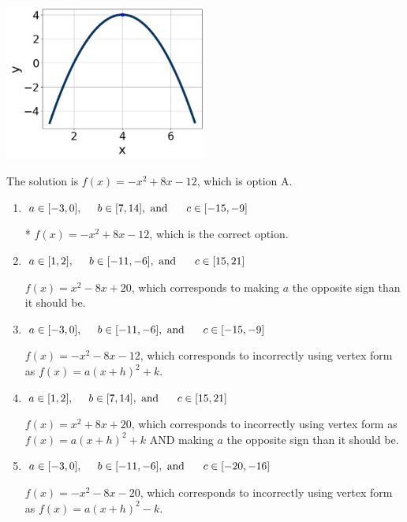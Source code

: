 \documentclass{extbook}[14pt]
\begin{document}
\begin{enumerate}
{\begin{center}
    \includegraphics[width=0.5\textwidth]{../Figures/quadraticGraphToEquationCopyA.png}
\end{center}


The solution is \( f(x) = -x^{2} +8 x -12 \), which is option A.\begin{enumerate}[label=\Alph*.]
\item \( a \in [-3, 0], \hspace*{5mm} b \in [7, 14], \text{ and } \hspace*{5mm} c \in [-15, -9] \)

* $f(x)=-x^{2} +8 x -12$, which is the correct option.
\item \( a \in [1, 2], \hspace*{5mm} b \in [-11, -6], \text{ and } \hspace*{5mm} c \in [15, 21] \)

$f(x)=x^{2} -8 x + 20$, which corresponds to making $a$ the opposite sign than it should be.
\item \( a \in [-3, 0], \hspace*{5mm} b \in [-11, -6], \text{ and } \hspace*{5mm} c \in [-15, -9] \)

$f(x)=-x^{2} -8 x -12$, which corresponds to incorrectly using vertex form as $f(x) = a(x+h)^2+k$.
\item \( a \in [1, 2], \hspace*{5mm} b \in [7, 14], \text{ and } \hspace*{5mm} c \in [15, 21] \)

$f(x)=x^{2} +8 x + 20$, which corresponds to incorrectly using vertex form as $f(x) = a(x+h)^2+k$ AND making $a$ the opposite sign than it should be.
\item \( a \in [-3, 0], \hspace*{5mm} b \in [-11, -6], \text{ and } \hspace*{5mm} c \in [-20, -16] \)

$f(x)=-x^{2} -8 x -20$, which corresponds to incorrectly using vertex form as $f(x) = a(x+h)^2 - k$.
\end{enumerate}

}
\end{enumerate}
\end{document}
